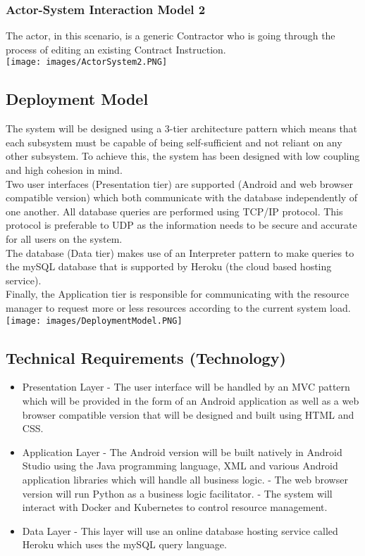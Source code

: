 \documentclass[11pt]{article}
\begin{document}
\subsubsection{Actor-System Interaction Model 2}
The actor, in this scenario, is a generic Contractor who is going through the process of editing an existing Contract Instruction.\\[0.5cm]
\texttt{[image: images/ActorSystem2.PNG]}
\subsection{Deployment Model}
The system will be designed using a 3-tier architecture pattern which means that each subsystem must be capable of being self-sufficient and not reliant on any other subsystem. To achieve this, the system has been designed with low coupling and high cohesion in mind.\\[0.5cm]
Two user interfaces (Presentation tier) are supported (Android and web browser compatible version) which both communicate with the database independently of one another. All database queries are performed using TCP/IP protocol. This protocol is preferable to UDP as the information needs to be secure and accurate for all users on the system.\\[0.5cm]
The database (Data tier) makes use of an Interpreter pattern to make queries to the mySQL database that is supported by Heroku (the cloud based hosting service).\\[0.5cm]
Finally, the Application tier is responsible for communicating with the resource manager to request more or less resources according to the current system load.\\[0.5cm]
\texttt{[image: images/DeploymentModel.PNG]}
\newpage
\subsection{Technical Requirements (Technology)} \label{technical}
\begin{itemize}
        \item Presentation Layer
            \subitem - The user interface will be handled by an MVC pattern which will be provided in the form of an Android application as well as a web browser compatible version that will be designed and built using HTML and CSS.
        \item Application Layer
            \subitem - The Android version will be built natively in Android Studio using the Java programming language, XML and various Android application libraries which will handle all business logic.
            \subitem - The web browser version will run Python as a business logic facilitator.
            \subitem - The system will interact with Docker and Kubernetes to control resource management.
        \item Data Layer
            \subitem - This layer will use an online database hosting service called Heroku which uses the mySQL query language.
    \end{itemize}
\end{document}
